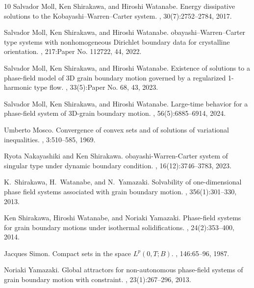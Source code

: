\documentclass{sinst}
\numberwithin{equation}{section}
\theoremstyle{plain}
\theoremstyle{definition}
\begin{document}
\begin{thebibliography}{10}
Salvador Moll, Ken Shirakawa, and Hiroshi Watanabe.
\newblock Energy dissipative solutions to the {K}obayashi--{W}arren--{C}arter
  system.
, 30(7):2752--2784, 2017.

Salvador Moll, Ken Shirakawa, and Hiroshi Watanabe.
obayashi--{W}arren--{C}arter type systems with nonhomogeneous
  {D}irichlet boundary data for crystalline orientation.
, 217:Paper No. 112722, 44, 2022.

Salvador Moll, Ken Shirakawa, and Hiroshi Watanabe.
\newblock Existence of solutions to a phase-field model of 3{D} grain boundary
  motion governed by a regularized 1-harmonic type flow.
, 33(5):Paper No. 68, 43, 2023.

Salvador Moll, Ken Shirakawa, and Hiroshi Watanabe.
\newblock Large-time behavior for a phase-field system of 3{D}-grain boundary
  motion.
, 56(5):6885--6914, 2024.

Umberto Mosco.
\newblock Convergence of convex sets and of solutions of variational
  inequalities.
, 3:510--585, 1969.

Ryota Nakayashiki and Ken Shirakawa.
obayashi-{W}arren-{C}arter system of singular type under dynamic
  boundary condition.
, 16(12):3746--3783, 2023.

K.~Shirakawa, H.~Watanabe, and N.~Yamazaki.
\newblock Solvability of one-dimensional phase field systems associated with
  grain boundary motion.
, 356(1):301--330, 2013.

Ken Shirakawa, Hiroshi Watanabe, and Noriaki Yamazaki.
\newblock Phase-field systems for grain boundary motions under isothermal
  solidifications.
, 24(2):353--400, 2014.

Jacques Simon.
\newblock Compact sets in the space {$L^p(0,T;B)$}.
, 146:65--96, 1987.

Noriaki Yamazaki.
\newblock Global attractors for non-autonomous phase-field systems of grain
  boundary motion with constraint.
, 23(1):267--296, 2013.

\end{thebibliography}
\end{document}
